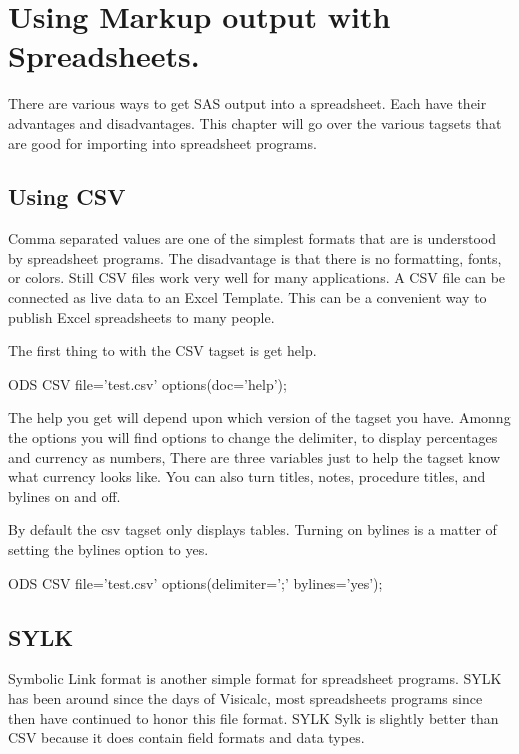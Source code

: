 \chapter{Using Markup output with Spreadsheets.}
There are various ways to get SAS output into a spreadsheet.
Each have their advantages and disadvantages.  This chapter
will go over the various tagsets that are good for importing into
spreadsheet programs.

\section{Using CSV}
Comma separated values are one of the simplest formats that are
is understood by spreadsheet programs.  The disadvantage is that
there is no formatting, fonts, or colors.  Still CSV files work
very well for many applications.  A CSV file can be connected as
live data to an Excel Template.  This can be a convenient way to
publish Excel spreadsheets to many people.  

The first thing to with the CSV tagset is get help.

\begin{sfvcode}
ODS CSV file='test.csv' options(doc='help');
\end{sfvcode}

The help you get will depend upon which version of the tagset you have.
Amonng the options you will find options to change the delimiter, to
display percentages and currency as numbers,  There are three variables
just to help the tagset know what currency looks like.  You can also
turn titles, notes, procedure titles, and bylines on and off.

By default the csv tagset only displays tables.  Turning on bylines
is a matter of setting the bylines option to yes.

\begin{sfvcode}
ODS CSV file='test.csv' options(delimiter=';' bylines='yes');
\end{sfvcode}


\section{SYLK}
Symbolic Link format is another simple format for spreadsheet 
programs. SYLK has been around since the days of Visicalc, most 
spreadsheets programs since then have continued to honor this 
file format. SYLK Sylk is slightly better
than CSV because it does contain field formats and data types.

